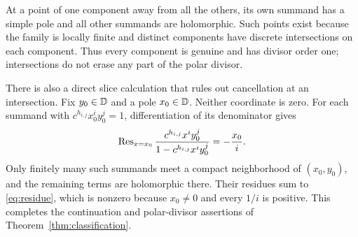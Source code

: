 At a point of one component away from all the others, its own
summand has a simple pole and all other summands are holomorphic.
Such points exist because the family is locally finite and distinct
components have discrete intersections on each component.
Thus every component is genuine and has divisor order one;
intersections do not erase any part of the polar divisor.

There is also a direct slice calculation that rules out cancellation
at an intersection. Fix \(y_0\in\mathbb D\) and a pole \(x_0\in\mathbb D\).
Neither coordinate is zero. For each summand with
\(c^{h_{i,j}}x_0^iy_0^j=1\), differentiation of its denominator gives
\[
\operatorname{Res}_{x=x_0}
\frac{c^{h_{i,j}}x^iy_0^j}{1-c^{h_{i,j}}x^iy_0^j}
=-\frac{x_0}{i}.
\]
Only finitely many such summands meet a compact neighborhood of
\((x_0,y_0)\), and the remaining terms are holomorphic there.
Their residues sum to \eqref{eq:residue}, which is nonzero because
\(x_0\ne0\) and every \(1/i\) is positive.
This completes the continuation and polar-divisor assertions of
Theorem~\ref{thm:classification}.
